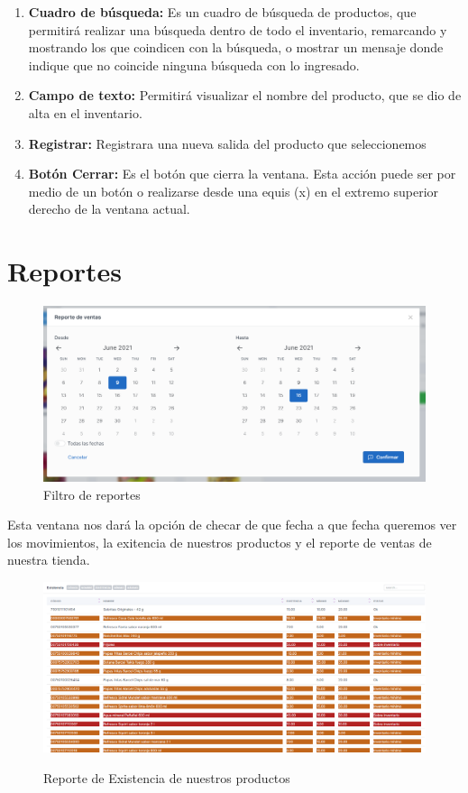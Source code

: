 \documentclass[a4paper,DIV=12]{scrreprt}
\begin{document}
\begin{enumerate}
	\item{\textbf{Cuadro de búsqueda:} Es un cuadro de búsqueda de productos, que permitirá realizar una búsqueda dentro de todo el inventario, remarcando y mostrando los que coindicen con la búsqueda, o mostrar un mensaje donde indique que no coincide ninguna búsqueda con lo ingresado.  }	

	\item{\textbf{Campo de texto:} Permitirá visualizar el nombre del producto, que se dio de alta en el inventario.}			
    \item \textbf{Registrar:} Registrara una nueva salida del producto que seleccionemos 
	\item{\textbf{Botón Cerrar:} Es el botón que cierra la ventana. Esta acción puede ser por medio de un botón o realizarse desde una equis (x) en el extremo superior derecho de la ventana actual.}	
	\end{enumerate}
	
	\clearpage
	
\section{Reportes}

	\begin{figure}[h!]
		\centering
		\includegraphics[scale=0.4]{FILTROREPORTES.PNG}
		\caption{Filtro de reportes}
	\end{figure}
	Esta ventana nos dará la opción de checar de que fecha a que fecha queremos ver los movimientos, la exitencia de nuestros productos y el reporte de ventas de nuestra tienda.\\
	
		\begin{figure}[h!]
		\centering
		\includegraphics[scale=0.4]{REPORTEEXISTENCIA.PNG}\\
		\caption{Reporte de Existencia de nuestros productos}
	\end{figure}
	
\end{document}
